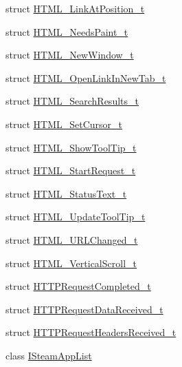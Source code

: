 \begin{DoxyCompactItemize}
\item 
struct \hyperlink{struct_valve_1_1_steamworks_1_1_h_t_m_l___link_at_position__t}{H\+T\+M\+L\+\_\+\+Link\+At\+Position\+\_\+t}
\item 
struct \hyperlink{struct_valve_1_1_steamworks_1_1_h_t_m_l___needs_paint__t}{H\+T\+M\+L\+\_\+\+Needs\+Paint\+\_\+t}
\item 
struct \hyperlink{struct_valve_1_1_steamworks_1_1_h_t_m_l___new_window__t}{H\+T\+M\+L\+\_\+\+New\+Window\+\_\+t}
\item 
struct \hyperlink{struct_valve_1_1_steamworks_1_1_h_t_m_l___open_link_in_new_tab__t}{H\+T\+M\+L\+\_\+\+Open\+Link\+In\+New\+Tab\+\_\+t}
\item 
struct \hyperlink{struct_valve_1_1_steamworks_1_1_h_t_m_l___search_results__t}{H\+T\+M\+L\+\_\+\+Search\+Results\+\_\+t}
\item 
struct \hyperlink{struct_valve_1_1_steamworks_1_1_h_t_m_l___set_cursor__t}{H\+T\+M\+L\+\_\+\+Set\+Cursor\+\_\+t}
\item 
struct \hyperlink{struct_valve_1_1_steamworks_1_1_h_t_m_l___show_tool_tip__t}{H\+T\+M\+L\+\_\+\+Show\+Tool\+Tip\+\_\+t}
\item 
struct \hyperlink{struct_valve_1_1_steamworks_1_1_h_t_m_l___start_request__t}{H\+T\+M\+L\+\_\+\+Start\+Request\+\_\+t}
\item 
struct \hyperlink{struct_valve_1_1_steamworks_1_1_h_t_m_l___status_text__t}{H\+T\+M\+L\+\_\+\+Status\+Text\+\_\+t}
\item 
struct \hyperlink{struct_valve_1_1_steamworks_1_1_h_t_m_l___update_tool_tip__t}{H\+T\+M\+L\+\_\+\+Update\+Tool\+Tip\+\_\+t}
\item 
struct \hyperlink{struct_valve_1_1_steamworks_1_1_h_t_m_l___u_r_l_changed__t}{H\+T\+M\+L\+\_\+\+U\+R\+L\+Changed\+\_\+t}
\item 
struct \hyperlink{struct_valve_1_1_steamworks_1_1_h_t_m_l___vertical_scroll__t}{H\+T\+M\+L\+\_\+\+Vertical\+Scroll\+\_\+t}
\item 
struct \hyperlink{struct_valve_1_1_steamworks_1_1_h_t_t_p_request_completed__t}{H\+T\+T\+P\+Request\+Completed\+\_\+t}
\item 
struct \hyperlink{struct_valve_1_1_steamworks_1_1_h_t_t_p_request_data_received__t}{H\+T\+T\+P\+Request\+Data\+Received\+\_\+t}
\item 
struct \hyperlink{struct_valve_1_1_steamworks_1_1_h_t_t_p_request_headers_received__t}{H\+T\+T\+P\+Request\+Headers\+Received\+\_\+t}
\item 
class \hyperlink{class_valve_1_1_steamworks_1_1_i_steam_app_list}{I\+Steam\+App\+List}

\end{DoxyCompactItemize}
